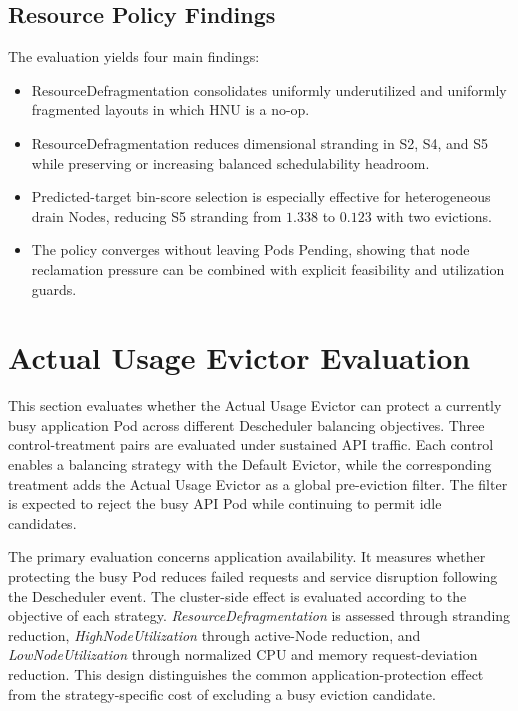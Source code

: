 \subsection{Resource Policy Findings}
\label{sec:defrag_findings}

The evaluation yields four main findings:

\begin{itemize}
    \item ResourceDefragmentation consolidates uniformly underutilized and uniformly fragmented layouts in which HNU is a no-op.
    \item ResourceDefragmentation reduces dimensional stranding in S2, S4, and S5 while preserving or increasing balanced schedulability headroom.
    \item Predicted-target bin-score selection is especially effective for heterogeneous drain Nodes, reducing S5 stranding from \(1.338\) to \(0.123\) with two evictions.
    \item The policy converges without leaving Pods Pending, showing that node reclamation pressure can be combined with explicit feasibility and utilization guards.
\end{itemize}

\section{Actual Usage Evictor Evaluation}
\label{sec:actualusage4_test}
This section evaluates whether the Actual Usage Evictor can protect a currently busy application Pod across different Descheduler balancing objectives. Three control-treatment pairs are evaluated under sustained API traffic. Each control enables a balancing strategy with the Default Evictor, while the corresponding treatment adds the Actual Usage Evictor as a global pre-eviction filter. The filter is expected to reject the busy API Pod while continuing to permit idle candidates.

The primary evaluation concerns application availability. It measures whether protecting the busy Pod reduces failed requests and service disruption following the Descheduler event. The cluster-side effect is evaluated according to the objective of each strategy. \textit{ResourceDefragmentation} is assessed through stranding reduction, \textit{HighNodeUtilization} through active-Node reduction, and \textit{LowNodeUtilization} through normalized CPU and memory request-deviation reduction. This design distinguishes the common application-protection effect from the strategy-specific cost of excluding a busy eviction candidate.


